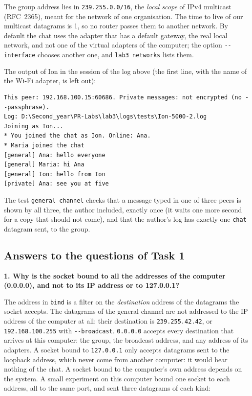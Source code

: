 \documentclass[11pt,a4paper]{article}
\newcommand{\question}[1]{\par\medskip\textbf{#1}\par}
\newcommand{\code}[1]{{\frenchspacing\texttt{#1}}}
\begin{document}
The group address lies in \code{239.255.0.0/16}, the \emph{local scope} of IPv4 multicast
(RFC~2365), meant for the network of one organisation. The time to live of our multicast datagrams
is 1, so no router passes them to another network. By default the chat uses the adapter that has a
default gateway, the real local network, and not one of the virtual adapters of the computer; the
option \code{-{}-interface} chooses another one, and \code{lab3 networks} lists them.

The output of Ion in the session of the log above (the first line, with the name of the Wi-Fi
adapter, is left out):

\begin{lstlisting}
This peer: 192.168.100.15:60686. Private messages: not encrypted (no --passphrase).
Log: D:\Second_year\PR-Labs\lab3\logs\tests\Ion-5000-2.log
Joining as Ion...
* You joined the chat as Ion. Online: Ana.
* Maria joined the chat
[general] Ana: hello everyone
[general] Maria: hi Ana
[general] Ion: hello from Ion
[private] Ana: see you at five
\end{lstlisting}

The test \code{general channel} checks that a message typed in one of three peers is shown by all
three, the author included, exactly once (it waits one more second for a copy that should not
come), and that the author's log has exactly one \code{chat} datagram sent, to the group.

\subsection{Answers to the questions of Task 1}

\question{1. Why is the socket bound to all the addresses of the computer (0.0.0.0), and not to its
IP address or to 127.0.0.1?}

The address in \code{bind} is a filter on the \emph{destination} address of the datagrams the socket
accepts. The datagrams of the general channel are not addressed to the IP address of the computer
at all: their destination is \code{239.255.42.42}, or \code{192.168.100.255} with
\code{-{}-broadcast}. \code{0.0.0.0} accepts every destination that arrives at this computer: the
group, the broadcast address, and any address of its adapters. A socket bound to
\code{127.0.0.1} only accepts datagrams sent to the loopback address, which never come from
another computer: it would hear nothing of the chat. A socket bound to the computer's own address
depends on the system. A small experiment on this computer bound one socket to each address, all to
the same port, and sent three datagrams of each kind:
\end{document}
